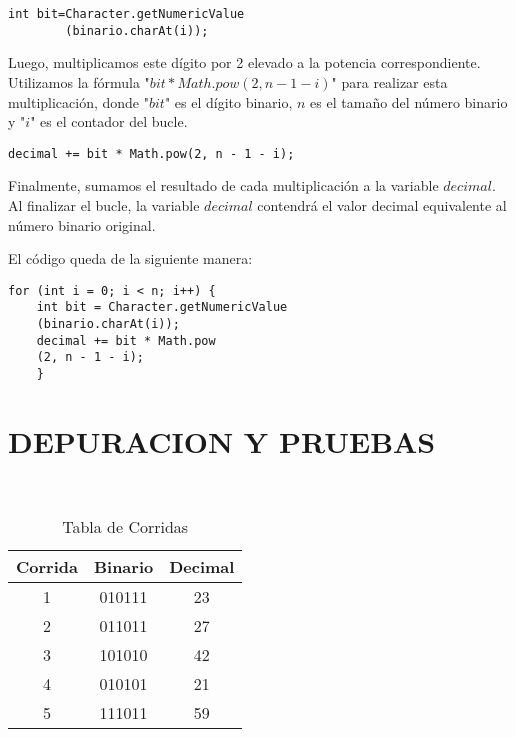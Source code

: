\documentclass{IEEEcsmag}
\begin{document}
\begin{lstlisting}[style=javaStyle]
    int bit=Character.getNumericValue
        (binario.charAt(i));
\end{lstlisting}

Luego, multiplicamos este dígito por 2 elevado a la potencia correspondiente. Utilizamos la fórmula "$bit * Math.pow(2, n - 1 - i)$" para realizar esta multiplicación, donde "$bit$" es el dígito binario, $n$ es el tamaño del número binario y "$i$" es el contador del bucle.

\begin{lstlisting}[style=javaStyle]
decimal += bit * Math.pow(2, n - 1 - i);
\end{lstlisting}

Finalmente, sumamos el resultado de cada multiplicación a la variable $decimal$.
Al finalizar el bucle, la variable $decimal$ contendrá el valor decimal equivalente al número binario original.

El código queda de la siguiente manera:\\
\begin{lstlisting}[style=javaStyle]
for (int i = 0; i < n; i++) {
    int bit = Character.getNumericValue
    (binario.charAt(i));
    decimal += bit * Math.pow
    (2, n - 1 - i);
    }
\end{lstlisting}

\section{DEPURACION Y PRUEBAS}
 
 \begin{table}[h]
     \centering
     \caption{Tabla de Corridas}\\
     
     \begin{tabular}{|c|c|c|}
     \hline
        Corrida & Binario & Decimal\\
        \hline
        1  & 010111 & 23\\
        \hline
        2  & 011011 & 27\\
        \hline
        3  & 101010 & 42\\
        \hline
        4  & 010101 & 21\\
        \hline
        5  & 111011 & 59\\
        \hline
     \end{tabular}
     \label{tab:my_label}
 \end{table}
\end{document}
